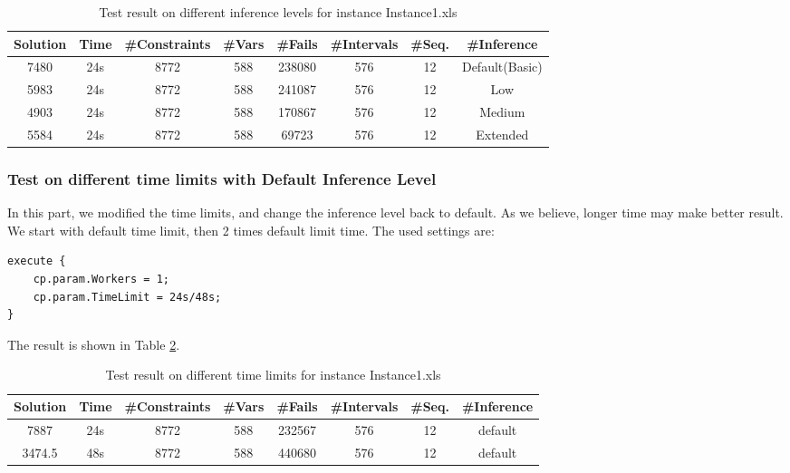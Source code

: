 \documentclass[a4paper, 12pt]{article}
\begin{document}
\begin{table}
    \centering
    \caption{Test result on different inference levels for instance Instance1.xls}
    \label{diffInfer1}
    \begin{tabular}{|c|c|c|c|c|c|c|c|}
        \hline
        Solution & Time & \#Constraints & \#Vars & \#Fails & \#Intervals & \#Seq. & \#Inference \\
        \hline
        7480 & 24s & 8772 & 588 & 238080 & 576 & 12 & Default(Basic) \\
        \hline 
        5983 & 24s & 8772 & 588 & 241087 & 576 & 12 & Low \\
        \hline
        4903 & 24s & 8772 & 588 & 170867 & 576 & 12 & Medium \\
        \hline
        5584 & 24s & 8772 & 588 & 69723 & 576 & 12 & Extended \\
        \hline
    \end{tabular}
\end{table}

\subsubsection{Test on different time limits with Default Inference Level}

In this part, we modified the time limits, and change the inference level back to default. As we believe, longer time may make better result. We start with default time limit, then 2 times default limit time. The used settings are: 

\begin{lstlisting}
execute {
    cp.param.Workers = 1;
    cp.param.TimeLimit = 24s/48s; 
}
\end{lstlisting}

The result is shown in Table \ref{diffTime1}.
\begin{table}
    \centering
    \caption{Test result on different time limits for instance Instance1.xls}
    \label{diffTime1}
    \begin{tabular}{|c|c|c|c|c|c|c|c|}
        \hline
        Solution & Time & \#Constraints & \#Vars & \#Fails & \#Intervals & \#Seq. & \#Inference \\
        \hline
        7887 & 24s & 8772 & 588 & 232567 & 576 & 12 & default \\
        \hline 
        3474.5 & 48s & 8772 & 588 & 440680 & 576 & 12 & default \\
        \hline
    \end{tabular}
\end{table}
\end{document}
